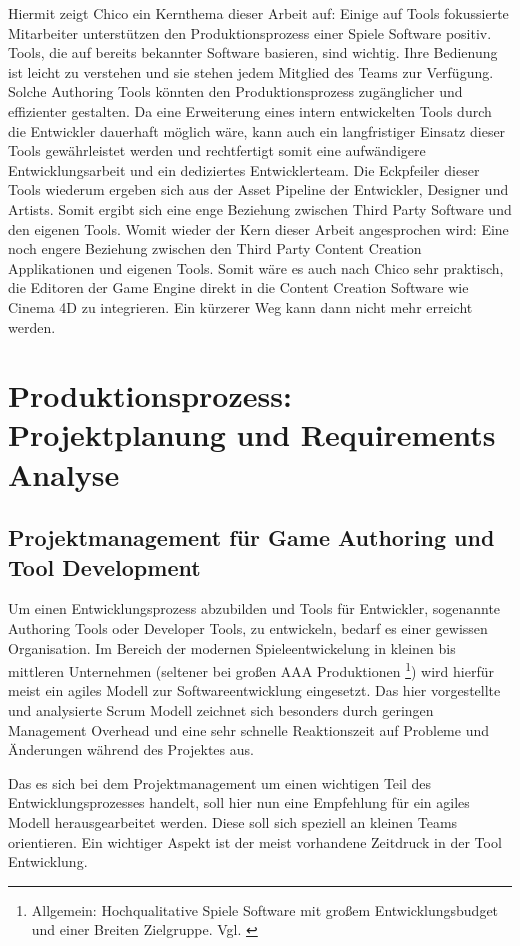 \documentclass[pagesize, paper=a4, fontsize=12pt, titlepage=true, headings=small, headnosepline, abstractoff, liststotoc, nochapterprefix, plainheadsepline, twoside]{scrreprt}
\begin{document}
Hiermit zeigt Chico ein Kernthema dieser Arbeit auf: Einige auf Tools fokussierte Mitarbeiter unterstützen den Produktionsprozess einer Spiele Software positiv. Tools, die auf bereits bekannter Software basieren, sind wichtig. Ihre Bedienung ist leicht zu verstehen und sie stehen jedem Mitglied des Teams zur Verfügung. Solche Authoring Tools könnten den Produktionsprozess zugänglicher und effizienter gestalten. Da eine Erweiterung eines intern entwickelten Tools durch die Entwickler dauerhaft möglich wäre, kann auch ein langfristiger Einsatz dieser Tools gewährleistet werden und rechtfertigt somit eine aufwändigere Entwicklungsarbeit und ein dediziertes Entwicklerteam. Die Eckpfeiler dieser Tools wiederum ergeben sich aus der Asset Pipeline der Entwickler, Designer und Artists. Somit ergibt sich eine enge Beziehung zwischen Third Party Software und den eigenen Tools. Womit wieder der Kern dieser Arbeit angesprochen wird: Eine noch engere Beziehung zwischen den Third Party Content Creation Applikationen und eigenen Tools. Somit wäre es auch nach Chico sehr praktisch, die Editoren der Game Engine direkt in die Content Creation Software wie Cinema 4D zu integrieren. Ein kürzerer Weg kann dann nicht mehr erreicht werden.

\chapter{Produktionsprozess: Projektplanung und Requirements Analyse}
\section{Projektmanagement für Game Authoring und Tool Development}
Um einen Entwicklungsprozess abzubilden und Tools für Entwickler, sogenannte Authoring Tools oder Developer Tools, zu entwickeln, bedarf es einer gewissen Organisation. Im Bereich der modernen Spieleentwickelung in kleinen bis mittleren Unternehmen (seltener bei großen AAA Produktionen \footnote{Allgemein: Hochqualitative Spiele Software mit großem Entwicklungsbudget und einer Breiten Zielgruppe. Vgl. \cite{GamasutraAAA2005} }) wird hierfür meist ein agiles Modell zur Softwareentwicklung eingesetzt. Das hier vorgestellte und analysierte Scrum Modell zeichnet sich besonders durch geringen Management Overhead und eine sehr schnelle Reaktionszeit auf Probleme und Änderungen während des Projektes aus.

Das es sich bei dem Projektmanagement um einen wichtigen Teil des Entwicklungsprozesses handelt, soll hier nun eine Empfehlung für ein agiles Modell herausgearbeitet werden. Diese soll sich speziell an kleinen Teams orientieren. Ein wichtiger Aspekt ist der meist vorhandene Zeitdruck in der Tool Entwicklung. 
\end{document}
